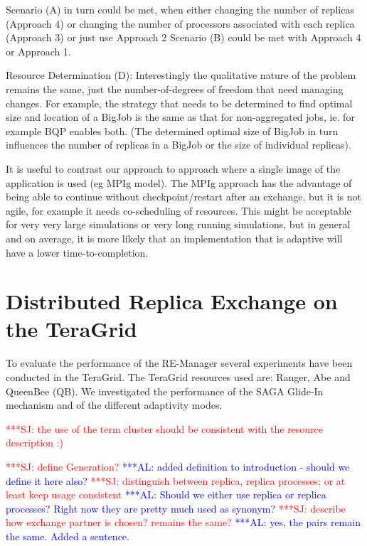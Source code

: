 \documentclass{rspublic}
\newcommand{\alnote}[1]{ {\textcolor{blue} { ***AL: #1 }}}
\newcommand{\jhanote}[1]{ {\textcolor{red} { ***SJ: #1 }}}
\newcommand{\alnote}[1]{}
\newcommand{\jhanote}[1]{}
\begin{document}
{Scenario (A) in turn could be met, when either changing the number of
replicas (Approach 4) or changing the number of processors associated
with each replica (Approach 3) or just use Approach 2 Scenario (B)
could be met with Approach 4 or Approach 1.

Resource Determination (D): Interestingly the qualitative nature of
the problem remains the same, just the number-of-degrees of freedom
that need managing changes. For example, the strategy that needs to be
determined to find optimal size and location of a BigJob is the same
as that for non-aggregated jobs, ie. for example BQP enables both.
(The determined optimal size of BigJob in turn influences the number
of replicas in a BigJob or the size of individual replicas).

It is useful to contrast our approach to approach where a single image
of the application is used (eg MPIg model). The MPIg approach has the
advantage of being able to continue without checkpoint/restart after
an exchange, but it is not agile, for example it needs co-scheduling
of resources. This might be acceptable for very very large simulations
or very long running simulations, but in general and on average, it
is more likely that an implementation that is adaptive will have a
lower time-to-completion.

\section{Distributed Replica Exchange on the TeraGrid}
\label{sec:exp}
        
To evaluate the performance of the RE-Manager several experiments have
been conducted in the TeraGrid. The TeraGrid resources used are: 
Ranger, Abe and QueenBee (QB). 
We investigated the performance of the SAGA Glide-In mechanism 
and of the different adaptivity modes.

\jhanote{the use of the term cluster should be consistent with the
  resource description :)}




\jhanote{define Generation?}            
\alnote{added definition to introduction - should we define it here also?}
\jhanote{distinguish  between replica, replica processes; or at least
 keep usage consistent}       
\alnote{Should we either use replica or replica processes? Right now they
are pretty much used as synonym?}
\jhanote{describe how exchange partner is chosen? remains the same?}\alnote{yes, the
pairs remain the same. Added a sentence.}

}
\end{document}

